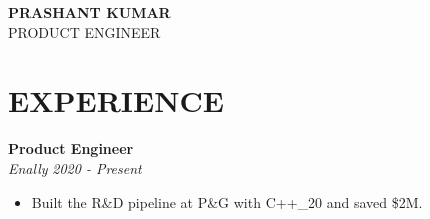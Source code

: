 \documentclass[a4paper,11pt]{article}
\begin{document}
\begin{center}{\Huge \textbf{PRASHANT KUMAR}}\\[4pt]{\large PRODUCT ENGINEER}\end{center}
\section*{EXPERIENCE}
\textbf{Product Engineer} \\
\textit{Enally} \hfill \textit{2020 - Present}
\begin{itemize}
  \item Built the R\&D pipeline at P\&G with C++\_20 and saved \$2M.
\end{itemize}
\end{document}
